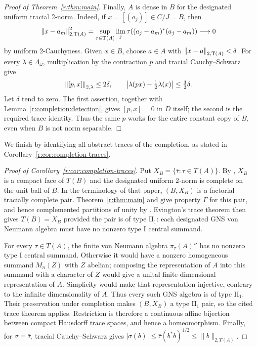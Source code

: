 \begin{proof}[Proof of Theorem~\ref{r:thm:main}]
Finally, \(A\) is dense in \(B\) for the designated uniform tracial
2-norm. Indeed, if \(x=[(a_j)]\in C/J=B\), then
\[
 \left\|x-a_m\right\|_{2,\operatorname T(A)}^2
 =\sup_{\tau\in\operatorname T(A)}
       \lim_j\tau((a_j-a_m)^*(a_j-a_m))\longrightarrow0
\]
by uniform 2-Cauchyness.
Given \(x\in B\), choose \(a\in A\) with
\(\left\|x-a\right\|_{2,\operatorname T(A)}<\delta\).
For every \(\lambda\in\Lambda_\omega\), multiplication by the
contraction \(p\) and tracial Cauchy--Schwarz give
\[
 \left\|[p,x]\right\|_{2,\lambda}\leq2\delta,\qquad
 \left|\lambda(px)-\tfrac12\lambda(x)\right|\leq\tfrac32\delta.
\]
Let \(\delta\) tend to zero. The first assertion, together with
Lemma~\ref{r:completion:detection}, gives \([p,x]=0\) in \(D\) itself;
the second is the required trace identity.
Thus the same \(p\) works for the entire constant copy of \(B\), even when
\(B\) is not norm separable.
\end{proof}

We finish by identifying all abstract traces of the completion, as stated
in Corollary~\ref{r:cor:completion-traces}.

\begin{proof}[Proof of Corollary~\ref{r:cor:completion-traces}]
Put $X_B=\{\bar\tau:\tau\in T(A)\}$. By
\cite[Proposition~3.23(ii)--(iv)]{CCEGSTW}, $X_B$ is a compact face of
$T(B)$ and the designated uniform $2$-norm is complete on the unit ball
of $B$. In the terminology of that paper, $(B,X_B)$ is a factorial
tracially complete pair.
Theorem~\ref{r:thm:main} and
\cite[Proposition~5.20]{CCEGSTW} give property $\Gamma$ for this pair,
and hence complemented partitions of unity by
\cite[Theorem~1.4]{CCEGSTW}. Evington's trace theorem
\cite[Theorem~B]{EvingtonTraces25} then gives $T(B)=X_B$ provided the
pair is of type $\mathrm{II}_1$: each designated GNS von Neumann algebra
must have no nonzero type I central summand.

For every $\tau\in T(A)$, the finite von Neumann algebra
$\pi_\tau(A)''$ has no nonzero type I central summand. Otherwise it
would have a nonzero homogeneous summand $M_n(Z)$ with $Z$ abelian;
composing the representation of $A$ into this summand with a character
of $Z$ would give a unital finite-dimensional representation of $A$.
Simplicity would make that representation injective, contrary to the
infinite dimensionality of $A$. Thus every such GNS algebra is of
type $\mathrm{II}_1$. Their preservation under completion
\cite[Proposition~3.23(vi)]{CCEGSTW} makes $(B,X_B)$ a type
$\mathrm{II}_1$ pair, so the cited trace theorem applies.
Restriction is therefore a continuous affine bijection between compact
Hausdorff trace spaces, and hence a homeomorphism. Finally, for
$\sigma=\bar\tau$, tracial Cauchy--Schwarz gives
$|\sigma(b)|\le\bar\tau(b^*b)^{1/2}\le\|b\|_{2,T(A)}$.
\end{proof}
